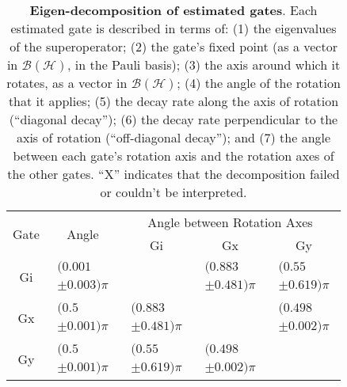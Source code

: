 \documentclass{article}[11pt]
\begin{document}
\begin{table}[h]
\begin{center}
\vspace{2em}
\begin{tabular}[l]{|c|c|c|c|c|}
\hline
\multirow{2}{*}{Gate} & \multirow{2}{*}{Angle} & \multicolumn{3}{c|}{Angle between Rotation Axes} \\ \cline{3-5}
 & & Gi & Gx & Gy \\ \hline
Gi & $ \begin{array}{c}(0.001 \\ \pm 0.003)\pi \end{array} $ &  & $ \begin{array}{c}(0.883 \\ \pm 0.481)\pi \end{array} $ & $ \begin{array}{c}(0.55 \\ \pm 0.619)\pi \end{array} $ \\ \hline
Gx & $ \begin{array}{c}(0.5 \\ \pm 0.001)\pi \end{array} $ & $ \begin{array}{c}(0.883 \\ \pm 0.481)\pi \end{array} $ &  & $ \begin{array}{c}(0.498 \\ \pm 0.002)\pi \end{array} $ \\ \hline
Gy & $ \begin{array}{c}(0.5 \\ \pm 0.001)\pi \end{array} $ & $ \begin{array}{c}(0.55 \\ \pm 0.619)\pi \end{array} $ & $ \begin{array}{c}(0.498 \\ \pm 0.002)\pi \end{array} $ &  \\ \hline
\end{tabular}

\caption{\textbf{Eigen-decomposition of estimated gates}.  Each estimated gate is described in terms of: (1) the eigenvalues of the superoperator; (2) the gate's fixed point (as a vector in $\mathcal{B}(\mathcal{H})$, in the Pauli basis); (3)  the axis around which it rotates, as a vector in $\mathcal{B}(\mathcal{H})$; (4) the angle of the rotation that it applies; (5) the decay rate along the axis of rotation (``diagonal decay''); (6) the decay rate perpendicular to the axis of rotation (``off-diagonal decay''); and (7) the angle between each gate's rotation axis and the rotation axes of the other gates.  ``X'' indicates that the decomposition failed or couldn't be interpreted. \label{bestGatesetDecompTable}}
\end{center}
\end{table}
\end{document}
